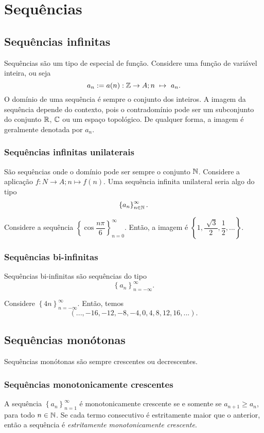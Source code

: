 \section{Sequências}
   \subsection{Sequências infinitas}
      Sequências são um tipo de especial de função. Considere uma função de variável inteira, ou seja $$a_{n} := a(n): \mathbb{Z} \to A; n\ \mapsto\ a_{n}.$$
      O domínio de uma sequência é sempre o conjunto dos inteiros. A imagem da sequência depende do contexto, pois o contradomínio pode ser um subconjunto do conjunto $\mathbb{R}$, $\mathbb{C}$ ou um espaço topológico. 
      De qualquer forma, a imagem é geralmente denotada por $a_{n}$.
      \subsubsection{Sequências infinitas unilaterais}
          São sequências onde o domínio pode ser sempre o conjunto $\mathbb{N}$. Considere a aplicação $f: N \to A; n \mapsto f(n).$ Uma sequência infinita unilateral seria algo do tipo $$\left\{a_{n}\right\}^{\infty}_{n \in \mathbb{N}}.$$
         \begin{exmp}
            Considere a sequência $\left\{\cos{\dfrac{n\pi}{6}}\right\}^{\infty}_{n=0}$. Então, a imagem é $\left\{1,\dfrac{\sqrt[]{3}}{2}, \dfrac{1}{2}, ...\right\}.$
         \end{exmp}
      
      \subsubsection{Sequências bi-infinitas}
         Sequências bi-infinitas são sequências do tipo $$\left\{a_{n}\right\}^{\infty}_{n=-\infty}.$$
         \begin{exmp}
            Considere $\left\{4n\right\}^{\infty}_{n=-\infty}$. Então, temos $$(..., -16,-12,-8,-4,0,4,8,12,16,...).$$
         \end{exmp}
   \subsection{Sequências monótonas}
      Sequências monótonas são sempre crescentes ou decrescentes. 
         \subsubsection{Sequências monotonicamente crescentes}
                  A sequência $\left\{a_{n}\right\}^{\infty}_{n=1}$ é monotonicamente crescente se e somente se $a_{n+1} \geq a_{n}$, para todo $n \in \mathbb{N}$. 
               Se cada termo consecutivo é estritamente maior que o anterior, então a sequência é \emph{estritamente monotonicamente crescente}.
